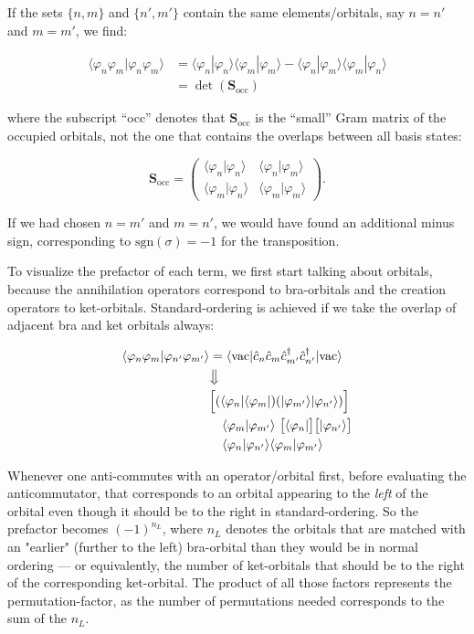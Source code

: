 If the sets $\{n,m\}$ and $\{n',m'\}$ contain the same
elements/orbitals, say $n=n'$ and $m=m'$, we find:

\begin{align}
\langle\varphi_n\varphi_m|\varphi_n\varphi_m\rangle
&= \langle\varphi_n|\varphi_n\rangle\langle\varphi_m|\varphi_m\rangle - \langle\varphi_n|\varphi_m\rangle\langle\varphi_m|\varphi_n\rangle\\
&= \det(\mathbf S_{\mathrm{occ}})
\end{align}

where the subscript ``occ'' denotes that $\mathbf S_{\mathrm{occ}}$ is
the ``small'' Gram matrix of the occupied orbitals, not the one that
contains the overlaps between all basis states:

\begin{equation}
\mathbf S_{\mathrm{occ}} = \begin{pmatrix}\langle\varphi_n|\varphi_n\rangle & \langle\varphi_n|\varphi_m\rangle\\ \langle\varphi_m|\varphi_n\rangle & \langle\varphi_m|\varphi_m\rangle\end{pmatrix}.
\end{equation}

If we had chosen $n=m'$ and $m=n'$, we would have found an additional
minus sign, corresponding to $\mathrm{sgn}(\sigma)=-1$ for the
transposition.

To visualize the prefactor of each term, we first start talking about
orbitals, because the annihilation operators correspond to bra-orbitals
and the creation operators to ket-orbitals. Standard-ordering is
achieved if we take the overlap of adjacent bra and ket orbitals always:

\begin{align*}
\langle\varphi_n\varphi_m|\varphi_{n'}\varphi_{m'}\rangle
&= \langle\mathrm{vac}|\hat c_n\hat c_m\hat c_{m'}^\dagger\hat c_{n'}^\dagger|\mathrm{vac}\rangle \notag\\
&\big\Downarrow \notag\\
&\Big[(\langle\varphi_n|\langle\varphi_m|)(|\varphi_{m'}\rangle|\varphi_{n'}\rangle)\Big] \notag\\
&\quad \langle\varphi_m|\varphi_{m'}\rangle\ \big[\langle\varphi_n|\big]\big[|\varphi_{n'}\rangle\big] \notag\\
&\quad \langle\varphi_n|\varphi_{n'}\rangle\langle\varphi_m|\varphi_{m'}\rangle
\end{align*}

Whenever one anti-commutes with an operator/orbital first, before
evaluating the anticommutator, that corresponds to an orbital appearing
to the \emph{left} of the orbital even though it should be to the
right in standard-ordering. So the prefactor becomes $(-1)^{n_L}$,
where $n_L$ denotes the orbitals that are matched with an "earlier" (further to the left)
bra-orbital than they would be in normal ordering --- or equivalently,
the number of ket-orbitals that should be to the right of the
corresponding ket-orbital. The product of all those factors represents
the permutation-factor, as the number of permutations needed
corresponds to the sum of the $n_L$.

